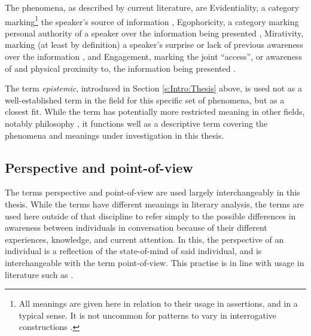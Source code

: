 The phenomena, as described by current literature, are Evidentiality, a category marking\footnote{All meanings are given here in relation to their usage in assertions, and in a typical sense. It is not uncommon for patterns to vary in interrogative constructions \cite{Aikhenvald2018Intro}.} the speaker's source of information \cite{SanRoque2019Evidentiality}, Egophoricity, a category marking personal authority of a speaker over the information being presented \cite{EgoIntro}, Mirativity, marking (at least by definition) a speaker's surprise or lack of previous awareness over the information \cite{DeLancey2012}, and Engagement, marking the joint ``access'', or awareness of and physical proximity to, the information being presented \cites{EvansBergqvistSanRoque2018a}{EvansBergqvistSanRoque2018b}.

The term \textit{epistemic}, introduced in Section \ref{s:Intro:Thesis} above, is used not as a well-established term in the field for this specific set of phenomena, but as a closest fit. While the term has potentially more restricted meaning in other fields, notably philosophy , it functions well as a descriptive term covering the phenomena and meanings under investigation in this thesis. 


\subsection{Perspective and point-of-view}\label{ss:Intro:PerspPOVDefs}
The terms perspective and point-of-view are used largely interchangeably in this thesis. While the terms have different meanings in literary analysis, the terms are used here outside of that discipline to refer simply to the possible differences in awareness between individuals in conversation because of their different experiences, knowledge, and current attention. In this, the perspective of an individual is a reflection of the state-of-mind of said individual, and is interchangeable with the term point-of-view. This practise is in line with usage in literature such as .

